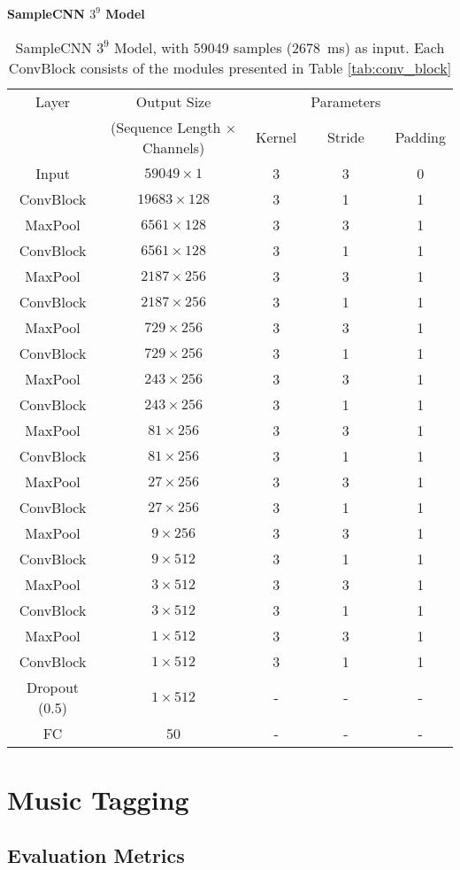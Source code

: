\begin{fullwidth}
    \begin{table*}[t]
        \centering
        \textbf{SampleCNN $3^9$ Model} \\
        \begin{tabular}{ccccc}
            \toprule Layer & Output Size & & Parameters & \\
            & (Sequence Length $\times$ Channels) & Kernel & Stride & Padding \\\hline
            Input & $59049 \times 1$ & 3 & 3 & 0 \\\hline
            ConvBlock & $19683 \times 128$ & 3 & 1 & 1 \\
            MaxPool & $6561 \times 128$ & 3 & 3 & 1 \\\hline
            ConvBlock & $6561 \times 128$ & 3 & 1 & 1 \\
            MaxPool & $2187 \times 256$ & 3 & 3 & 1 \\\hline
            ConvBlock & $2187 \times 256$ & 3 & 1 & 1 \\
            MaxPool & $729 \times 256$ & 3 & 3 & 1 \\\hline
            ConvBlock & $729 \times 256$ & 3 & 1 & 1 \\
            MaxPool & $243 \times 256$ & 3 & 3 & 1 \\\hline
            ConvBlock & $243 \times 256$ & 3 & 1 & 1 \\
            MaxPool & $81 \times 256$ & 3 & 3 & 1 \\\hline
            ConvBlock & $81 \times 256$ & 3 & 1 & 1 \\
            MaxPool & $27 \times 256$ & 3 & 3 & 1 \\\hline
            ConvBlock & $27 \times 256$ & 3 & 1 & 1 \\
            MaxPool & $9 \times 256$ & 3 & 3 & 1 \\\hline
            ConvBlock & $9 \times 512$ & 3 & 1 & 1 \\
            MaxPool & $3 \times 512$ & 3 & 3 & 1 \\\hline
            ConvBlock & $3 \times 512$ & 3 & 1 & 1 \\
            MaxPool & $1 \times 512$ & 3 & 3 & 1 \\\hline
            ConvBlock & $1 \times 512$ & 3 & 1 & 1 \\
            Dropout (0.5) & $1 \times 512$ & - & - & - \\\hline
            FC & 50 & - & - & - \\
            \bottomrule
        \end{tabular}
        \caption{SampleCNN $3^9$ Model, with 59049 samples (2678~ms) as input. Each ConvBlock consists of the modules presented in Table \ref{tab:conv_block}}
        \label{tab:samplecnn_model}
    \end{table*}
\end{fullwidth}


\section{Music Tagging}

\subsection{Evaluation Metrics}
